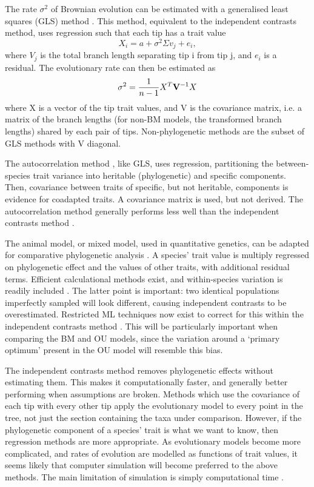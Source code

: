 \documentclass[12pt]{article}
\begin{document}
The rate $\sigma^2$ of Brownian evolution can be estimated with a generalised least squares (GLS) method \citep{pagel_inferring_1997}. 
This method, equivalent to the independent contrasts method, uses regression such that each tip has a trait value
\begin{equation}
	X_i = a + \sigma^2 \Sigma v_j + e_i,
\end{equation}
where $V_j$ is the total branch length separating tip i from tip j, and $e_i$ is a residual. 
The evolutionary rate can then be estimated as
\begin{equation}
	\sigma^2 = \frac{1}{n-1} X^T \bold{V}^{-1} X
\end{equation}
where X is a vector of the tip trait values, and V is the covariance matrix, i.e. a matrix of the branch lengths (for non-BM models, the transformed branch lengths) shared by each pair of tips. 
Non-phylogenetic methods are the subset of GLS methods with V diagonal.

The autocorrelation method \citep{cheverud_quantitative_1985}, like GLS, uses regression, partitioning the between-species trait variance into heritable (phylogenetic) and specific components. 
Then, covariance between traits of specific, but not heritable, components is evidence for coadapted traits. 
A covariance matrix is used, but not derived. 
The autocorrelation method generally performs less well than the independent contrasts method \citep{diaz-uriarte_testing_1996}. 

The animal model, or mixed model, used in quantitative genetics, can be adapted for comparative phylogenetic analysis \citep{lynch_methods_1991}. 
A species' trait value is multiply regressed on phylogenetic effect and the values of other traits, with additional residual terms. 
Efficient calculational methods exist, and within-species variation is readily included \citep{hadfield_general_2010}. 
The latter point is important: two identical populations imperfectly sampled will look different, causing independent contrasts to be overestimated. 
Restricted ML techniques now exist to correct for this within the independent contrasts method \citep{ives_within-species_2007,felsenstein_comparative_2008}. 
This will be particularly important when comparing the BM and OU models, since the variation around a `primary optimum' present in the OU model will resemble this bias. 


The independent contrasts method removes phylogenetic effects without estimating them. 
This makes it computationally faster, and generally better performing when assumptions are broken. 
Methods which use the covariance of each tip with every other tip apply the evolutionary model to every point in the tree, not just the section containing the taxa under comparison. 
However, if the phylogenetic component of a species' trait is what we want to know, then regression methods are more appropriate. 
As evolutionary models become more complicated, and rates of evolution are modelled as functions of trait values, it seems likely that computer simulation will become preferred to the above methods. 
The main limitation of simulation is simply computational time \citep{garland_introduction_1999}. 
\end{document}
